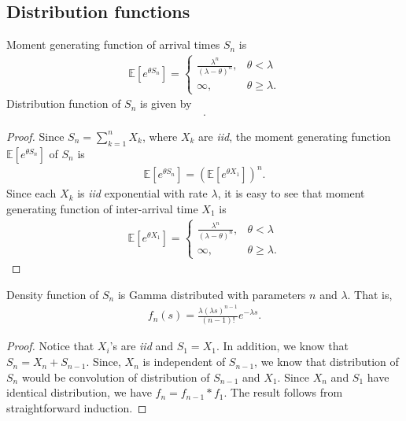 \documentclass[a4paper,10pt,english]{article}
\begin{document}
\subsection{Distribution functions}
\begin{lem} Moment generating function of arrival times $S_n$ is 
 \begin{align*}
  \mathbb{E} [ e^{\theta S_n} ] = 
		\begin{cases}
		\frac{\lambda^n}{(\lambda-\theta)^n}, & \theta < \lambda \\
		\infty, & \theta \geqslant \lambda.
		\end{cases} 
 \end{align*} 
 Distribution function of $S_n$ is given by 
 \begin{align*}.
 \end{align*}
\end{lem}
\begin{proof} 
Since $S_n = \sum_{k=1}^nX_k$, where $X_k$ are \emph{iid}, the moment generating function $\mathbb{E} [ e^{\theta S_{n}} ]$ of $S_n$ is 
 \begin{align*}
  \mathbb{E} [ e^{\theta S_{n}} ] = \left(\mathbb{E}[e^{\theta X_{1}}]\right)^{n}. 
 \end{align*} 
Since each $X_k$ is \emph{iid} exponential with rate $\lambda$, it is easy to see that moment generating function of inter-arrival time $X_1$ is 
 \begin{align*}
  \mathbb{E} [ e^{\theta X_1} ] = 
		\begin{cases}
		\frac{\lambda^n}{(\lambda-\theta)^n}, & \theta < \lambda \\
		\infty, & \theta \geqslant \lambda.
		\end{cases} 
 \end{align*} 
\end{proof}

\begin{thm} Density function of $S_n$ is Gamma distributed with parameters $n$ and $\lambda$. That is,
\begin{align*}
f_{n}(s) =\frac{\lambda (\lambda s)^{n-1}} {(n-1)!} e^{-\lambda s}.
\end{align*}
\end{thm}
\begin{proof} Notice that $X_i$'s are \emph{iid} and $S_1 = X_1$. In addition, we know that $S_n = X_n + S_{n-1}$. Since, $X_n$ is independent of $S_{n-1}$, we know that distribution of $S_n$ would be convolution of distribution of $S_{n-1}$ and $X_1$. Since $X_n$ and $S_1$ have identical distribution, we have $f_{n}=f_{n-1}*f_{1}$. The result follows from straightforward induction.
\end{proof}
\end{document}
